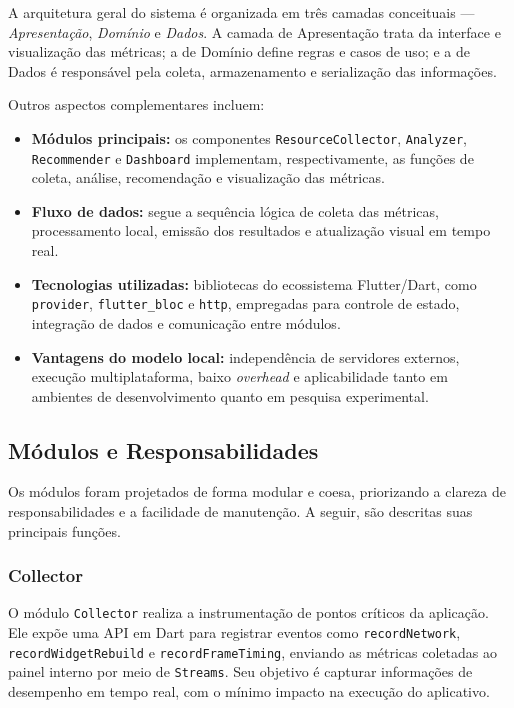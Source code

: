 \documentclass[12pt,a4paper,oneside]{abntex2}
\begin{document}
A arquitetura geral do sistema é organizada em três camadas conceituais — \textit{Apresentação}, \textit{Domínio} e \textit{Dados}.  
A camada de Apresentação trata da interface e visualização das métricas; a de Domínio define regras e casos de uso; e a de Dados é responsável pela coleta, armazenamento e serialização das informações.

Outros aspectos complementares incluem:

\begin{itemize}
  \item \textbf{Módulos principais:} os componentes \texttt{ResourceCollector}, \texttt{Analyzer}, \texttt{Recommender} e \texttt{Dashboard} implementam, respectivamente, as funções de coleta, análise, recomendação e visualização das métricas.
  \item \textbf{Fluxo de dados:} segue a sequência lógica de coleta das métricas, processamento local, emissão dos resultados e atualização visual em tempo real.
  \item \textbf{Tecnologias utilizadas:} bibliotecas do ecossistema Flutter/Dart, como \texttt{provider}, \texttt{flutter\_bloc} e \texttt{http}, empregadas para controle de estado, integração de dados e comunicação entre módulos.
  \item \textbf{Vantagens do modelo local:} independência de servidores externos, execução multiplataforma, baixo \textit{overhead} e aplicabilidade tanto em ambientes de desenvolvimento quanto em pesquisa experimental.
\end{itemize}

\subsection{Módulos e Responsabilidades}

Os módulos foram projetados de forma modular e coesa, priorizando a clareza de responsabilidades e a facilidade de manutenção. A seguir, são descritas suas principais funções.

\subsubsection{Collector}
O módulo \texttt{Collector} realiza a instrumentação de pontos críticos da aplicação. Ele expõe uma API em Dart para registrar eventos como \texttt{recordNetwork}, \texttt{recordWidgetRebuild} e \texttt{recordFrameTiming}, enviando as métricas coletadas ao painel interno por meio de \texttt{Streams}.  
Seu objetivo é capturar informações de desempenho em tempo real, com o mínimo impacto na execução do aplicativo.
\end{document}
